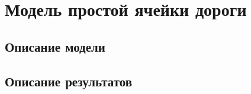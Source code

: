 \section{Модель простой ячейки дороги}

\subsection{Описание модели}

\subsection{Описание результатов}

\clearpage